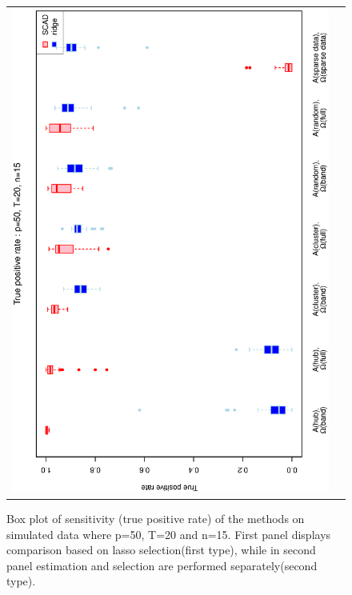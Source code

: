 \documentclass[a4paper]{article}
\begin{document}
\begin{figure}[h!]
\begin{tabular}{cc}
\includegraphics[scale=0.5,angle=270]{ROCtpr50T20N15b.eps}\\
\end{tabular}
\caption{Box plot of sensitivity (true positive rate) of the methods on simulated data where p=50, T=20 and n=15. First panel displays comparison based on lasso selection(first type), while in second panel estimation and selection are performed separately(second type).}
\label{fig:tpr50T20N15}
\end{figure}
 
\end{document}
